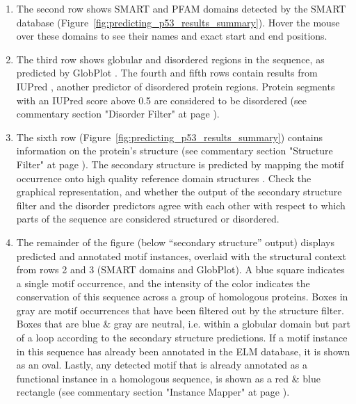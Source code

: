 \documentclass[12pt]{article}
\begin{document}
\begin{enumerate}
\item The second row shows SMART and PFAM domains detected by the SMART
	database \citep{9600884, 25300481, 9600884}
	(Figure~\ref{fig:predicting_p53_results_summary}). Hover the
	mouse over these domains to see their names and exact start and end
	positions.


\item The third row shows globular and disordered regions in the
	sequence, as predicted by GlobPlot \citep{12824398}. The fourth
	and fifth rows
	contain results from IUPred \citep{15955779}, another
	predictor of disordered protein regions. Protein segments with
	an IUPred score above 0.5 are considered to be disordered
	(see commentary section "Disorder Filter" at page \pageref{DisorderFilter}).


\item The sixth row (Figure~\ref{fig:predicting_p53_results_summary}) contains
	information on the protein's structure (see commentary section "Structure Filter" at page \pageref{StructureFilter}).
	The secondary structure is
	predicted by mapping the motif occurrence onto high quality
	reference domain structures \citep{19852836}. Check the graphical
	representation, and whether the output of the secondary structure filter and
	the disorder predictors agree with each other with respect to which parts of the
	sequence are considered structured or disordered.

\item The remainder of the figure (below ``secondary structure'' output)
	displays predicted and annotated motif instances, overlaid with the
	structural context from rows 2 and 3 (SMART domains and GlobPlot). A
	blue square indicates a single motif occurrence, and the intensity of the
	color indicates the conservation of this sequence across a group of
	homologous proteins.
	Boxes in gray are motif occurrences that have been filtered out by the
	structure filter. Boxes that are blue \& gray are neutral, i.e.
	within a globular domain but part of a loop
	according to the secondary structure predictions.
	If a motif instance in this sequence has already been annotated in the ELM
	database, it is shown as an oval. Lastly, any detected motif that is already
	annotated as a functional instance in a homologous sequence, is shown as a
	red \& blue rectangle (see commentary section "Instance Mapper" at
	page \pageref{InstanceMapper}).


\end{enumerate}
\end{document}
